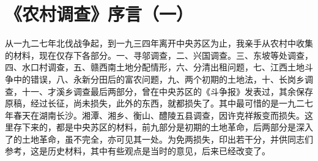\section[《农村调查》序言（一）（一九三七年十月六日）]{《农村调查》序言（一）}


从一九二七年北伐战争起，到一九三四年离开中央苏区为止，我亲手从农村中收集的材料，现在仅存下各部分。一、寻邬调查，二、兴国调查。三、东坡等处调查，四、水口村调查，五、赣西南土地分配情形，六、分清出租问题，七、江西土地斗争中的错误，八、永新分田后的富农问题，九、两个初期的土地法，十、长岗乡调查，十一、才溪乡调查最后两部分，曾在中央苏区的《斗争报》发表过，其余保存原稿，经过长征，尚未损失，此外的东西，就都损失了。其中最可惜的是一九二七年春天在湖南长沙。湘潭、湘乡、衡山、醴陵五县调查，因许克祥叛变而损失。这里存下来的，都是中央苏区的材料，前九部分是初期的土地革命，后两部分是深入了的土地革命，虽不完全，亦可见其一处。为免两损失，印出若干分，并供同志们参考，这是历史材料，其中有些观点是当时的意见，后来已经改变了。

